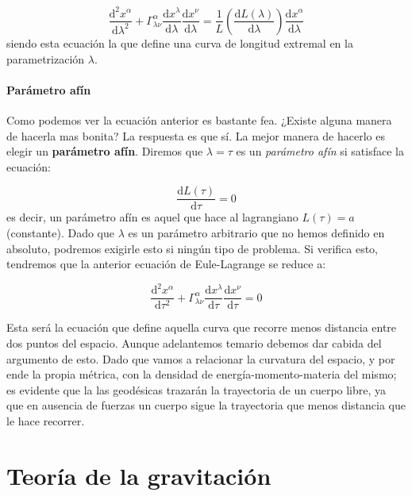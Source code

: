 \documentclass[12pt,a4paper]{book}
\numberwithin{equation}{section}
\numberwithin{figure}{section}
\newcommand{\parentesis}[1]{\left( #1  \right)}
\newcommand{\D}{\mathrm{d}}
\newcommand{\derivadas}[2]{\frac{\D #1}{\D #2}}
\begin{document}
\begin{equation}
\derivadas{^2 x^\alpha}{\lambda^2} + \Gamma^\alpha_{\lambda \nu} \derivadas{x^\lambda}{\lambda} \derivadas{x^\nu}{\lambda} = \dfrac{1}{L} \parentesis{\derivadas{L (\lambda)}{\lambda}} \derivadas{x^\alpha}{\lambda} 
\end{equation} 
siendo esta ecuación la que define una curva de longitud extremal en la parametrización $\lambda$.

\subsubsection{Parámetro afín}

Como podemos ver la ecuación anterior es bastante fea. ¿Existe alguna manera de hacerla mas bonita? La respuesta es que sí. La mejor manera de hacerlo es elegir un \textbf{parámetro afín}. Diremos que $\lambda = \tau$ es un \textit{parámetro afín} si satisface la ecuación:

\begin{equation}
\derivadas{L(\tau)}{\tau} = 0
\end{equation}
es decir, un parámetro afín es aquel que hace al lagrangiano $L(\tau)=a$ (constante). Dado que $\lambda$ es un parámetro arbitrario que no hemos definido en absoluto, podremos exigirle esto si ningún tipo de problema. Si verifica esto, tendremos que la anterior ecuación de Eule-Lagrange se reduce a:

\begin{equation}
\derivadas{^2x^\alpha}{\tau^2} + \Gamma^\alpha_{\lambda \nu} \derivadas{x^\lambda}{\tau	} \derivadas{x^\nu}{\tau} = 0
\end{equation}

Esta será la ecuación que define aquella curva que recorre menos distancia entre dos puntos del espacio. Aunque adelantemos temario debemos dar cabida del argumento de esto. Dado que vamos a relacionar la curvatura del espacio, y por ende la propia métrica, con la densidad de energía-momento-materia del mismo; es evidente que la las geodésicas trazarán la trayectoria de un cuerpo libre, ya que en ausencia de fuerzas un cuerpo sigue la trayectoria que menos distancia que le hace recorrer. 

 \newpage

\chapter{Teoría de la gravitación}

\newpage
\end{document}
